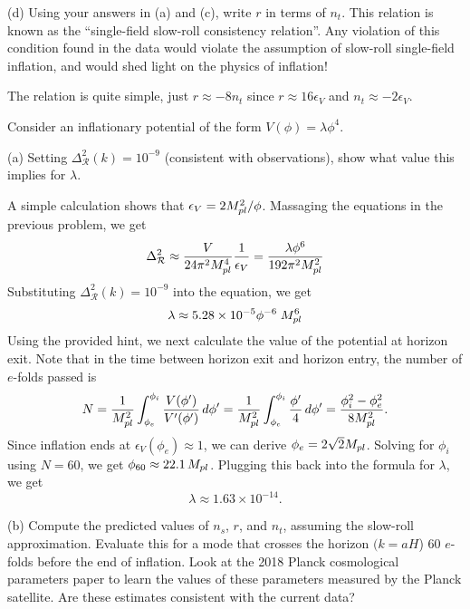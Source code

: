\documentclass{lkx_pset}
\begin{document}
\begin{parts}
  \begin{part}{(d)}
    Using your answers in (a) and (c), write $r$ in terms of $n_t$. This relation is known as the ``single-field slow-roll consistency relation''. Any violation of this condition found in the data would violate the assumption of slow-roll single-field inflation, and would shed light on the physics of inflation!
  \end{part}
  The relation is quite simple, just $r\approx -8n_t$ since $r\approx 16\epsilon_V$ and $n_t \approx -2\epsilon_V$.
\end{parts}

\begin{problem}{3}
  Consider an inflationary potential of the form $V(\phi)=\lambda\phi^4$.
\end{problem}
\begin{parts}
  \begin{part}{(a)}
    Setting $\Delta_{\mathcal{R}}^2(k)=10^{-9}$ (consistent with observations), show what value this implies for $\lambda$. 
  \end{part}
  A simple calculation shows that $\epsilon_V=2M_{pl}^2/\phi$.
  Massaging the equations in the previous problem, we get
  \[
    \Delta_{\mathcal{R}}^2 \approx \frac{V}{24\pi^2M_{pl}^4}\frac{1}{\epsilon_V} = \frac{\lambda\phi^6}{192\pi^2M_{pl}^2}
  \]
  Substituting $\Delta_{\mathcal{R}}^2(k)=10^{-9}$ into the equation, we get
  \[
    \lambda\approx 5.28\times 10^{-5}\phi^{-6}\;M_{pl}^6
  \]
  Using the provided hint, we next calculate the value of the potential at horizon exit. Note that in the time between horizon exit and horizon entry, the number of $e$-folds passed is
  \[
    N = \frac{1}{M_{pl}^2}\int_{\phi_e}^{\phi_i}\frac{V(\phi')}{V'(\phi')}\,d\phi' = \frac{1}{M_{pl}^2}\int_{\phi_e}^{\phi_i}\frac{\phi'}{4}\,d\phi' = \frac{\phi_i^2-\phi_e^2}{8M_{pl}^2}.
  \]
  Since inflation ends at $\epsilon_V(\phi_e)\approx 1$, we can derive $\phi_e = 2\sqrt{2}M_{pl}$. Solving for $\phi_i$ using $N=60$, we get $\phi_{60}\approx 22.1\,M_{pl}$. Plugging this back into the formula for $\lambda$, we get
  \[
    \lambda \approx 1.63\times 10^{-14}.
  \]
  \begin{part}{(b)}
    Compute the predicted values of $n_s$, $r$, and $n_t$, assuming the slow-roll approximation. Evaluate this for a mode that crosses the horizon $(k=aH$) $60$ $e$-folds before the end of inflation. Look at the 2018 Planck cosmological parameters paper to learn the values of these parameters measured by the Planck satellite. Are these estimates consistent with the current data?

\end{part}
\end{parts}
\end{document}
